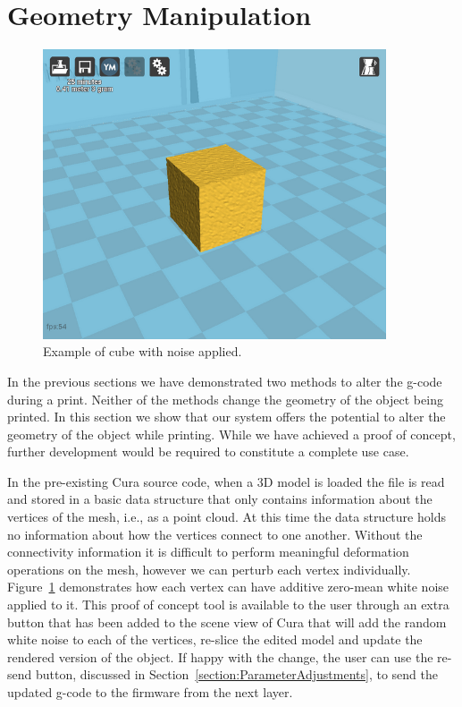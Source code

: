\documentclass[11pt]{report} %
\begin{document}
\section{Geometry Manipulation}
\label{section:GeometryManipulation}
\begin{figure}[H]
  \centering
  \includegraphics[width=4in]{CubeNoise.png}
  \caption{Example of cube with noise applied.}
  \label{figure:CubeNoise}
\end{figure}

In the previous sections we have demonstrated two methods to alter the g-code during a print. Neither of the methods change the geometry of the object being printed. In this section we show that our system offers the potential to alter the geometry of the object while printing. While we have achieved a proof of concept, further development would be required to constitute a complete use case. 

In the pre-existing Cura source code, when a 3D model is loaded the file is read and stored in a basic data structure that only contains information about the vertices of the mesh, i.e., as a point cloud. At this time the data structure holds no information about how the vertices connect to one another. Without the connectivity information it is difficult to perform meaningful deformation operations on the mesh, however we can perturb each vertex individually. Figure~\ref{figure:CubeNoise} demonstrates how each vertex can have additive zero-mean white noise applied to it. This proof of concept tool is available to the user through an extra button that has been added to the scene view of Cura that will add the random white noise to each of the vertices, re-slice the edited model and update the rendered version of the object. If happy with the change, the user can use the re-send button, discussed in Section~\ref{section:ParameterAdjustments}, to send the updated g-code to the firmware from the next layer.
\end{document}
